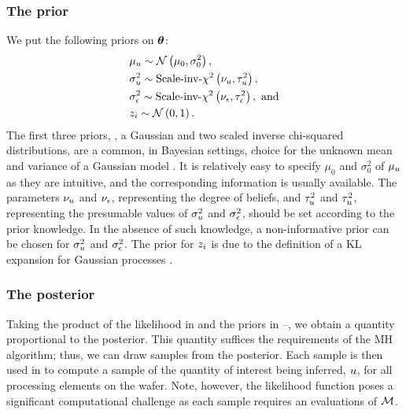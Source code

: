 \subsubsection{The prior}
We put the following priors on ${\boldsymbol\theta}$:
\begin{align}
  & \mu_\u \sim \gaussian{\mu_0}{\sigma^2_0}, \elabel{mu-u-prior} \\
  & \sigma^2_\u \sim \sichisquared{\nu_\u}{\tau^2_\u}, \elabel{sigma2-u-prior} \\
  & \sigma^2_\noise \sim \sichisquared{\nu_\noise}{\tau^2_\noise}, \text{ and} \elabel{sigma2-noise-prior} \\
  & \z_i \sim \gaussian{0}{1}. \elabel{z-prior}
\end{align}
The first three priors, \ie, a Gaussian and two scaled inverse chi-squared distributions, are a common, in Bayesian settings, choice for the unknown mean and variance of a Gaussian model \cite{gelman2004}. It is relatively easy to specify $\mu_0$ and $\sigma^2_0$ of $\mu_u$ as they are intuitive, and the corresponding information is usually available. The parameters $\nu_u$ and $\nu_\epsilon$, representing the degree of beliefs, and $\tau^2_u$ and $\tau^2_u$, representing the presumable values of $\sigma^2_u$ and $\sigma^2_\epsilon$, should be set according to the prior knowledge. In the absence of such knowledge, a non-informative prior can be chosen for $\sigma^2_u$ and $\sigma^2_\epsilon$. The prior for $z_i$ is due to the definition of a KL expansion for Gaussian processes \cite{marzouk2009}.

\subsubsection{The posterior}
Taking the product of the likelihood in  and the priors in --, we obtain a quantity proportional to the posterior. This quantity suffices the requirements of the MH algorithm; thus, we can draw samples from the posterior. Each sample is then used in  to compute a sample of the quantity of interest being inferred, $u$, for all processing elements on the wafer. Note, however, the likelihood function poses a significant computational challenge as each sample requires an evaluations of $\model$.
